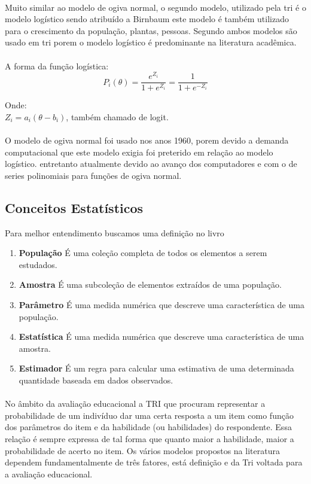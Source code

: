     \paragraph{}
        Muito similar ao modelo de ogiva normal, o segundo modelo, utilizado pela tri é o modelo logístico sendo atribuído a Birnbaum este modelo é também utilizado para o crescimento da população, plantas, pessoas. Segundo \cite{Baker} ambos modelos são usado em tri porem o modelo logístico é predominante na literatura acadêmica.
    \paragraph{}
        A forma da função logística:
    \begin{equation}
        P_i(\theta) = \displaystyle\frac{e^{Z_i}}{1 + e^{Z_i}} = \displaystyle\frac{1}{1 + e^{-Z_i}}
    \end{equation}
    
    Onde:\\
    $Z_i = a_i(\theta - b_i)$, também chamado de logit. 
    \paragraph{}
        O modelo de ogiva normal foi usado nos anos 1960, porem devido a demanda computacional que este modelo exigia foi preterido em relação ao modelo logístico. entretanto atualmente devido ao avanço dos computadores e com o de series polinomiais para funções de ogiva normal.
	\subsection{Conceitos Estatísticos}
    	Para melhor entendimento buscamos uma definição no livro \cite{Sonia}
	 \begin{enumerate}
	 	\item[]  \textbf{População} É uma coleção completa de todos os elementos a serem estudados.
	 	\item[] \textbf{Amostra} É uma subcoleção de elementos extraídos de uma população.
	 	\item[] \textbf{Parâmetro} É uma medida numérica que descreve uma característica de uma população.
	 	 \item[] \textbf{Estatística} É uma medida numérica que descreve uma característica de uma amostra.
	 	 \item[] \textbf{Estimador} É um regra para calcular uma estimativa de uma determinada quantidade baseada em dados observados.
	\end{enumerate}
	\paragraph{}
	    No âmbito da avaliação educacional a TRI  que procuram representar a probabilidade de um indivíduo dar uma certa resposta a um item como função dos parâmetros do item e da habilidade (ou habilidades) do respondente. Essa relação é sempre expressa de tal forma que quanto maior a habilidade, maior a probabilidade de acerto no item. Os vários modelos propostos na literatura dependem fundamentalmente de três fatores, está definição e da Tri voltada para a avaliação educacional.

	\newpage